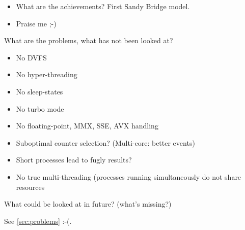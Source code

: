 
\begin{itemize}

\item What are the achievements? First Sandy Bridge model.

\item Praise me ;-)

\end{itemize}


\label{sec:problems}

What are the problems, what has not been looked at?

\begin{itemize}

\item No DVFS

\item No hyper-threading

\item No sleep-states

\item No turbo mode

\item No floating-point, MMX, SSE, AVX handling

\item Suboptimal counter selection? (Multi-core: better events)

\item Short processes lead to fugly results?

\item No true multi-threading (processes running simultaneously do not share
resources

\end{itemize}


\label{sec:outlook}

What could be looked at in future? (what's missing?)

See \ref{sec:problems} :-(.
